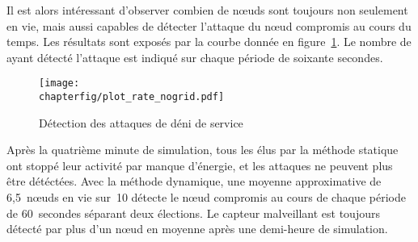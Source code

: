 Il est alors intéressant d'observer combien de nœuds sont toujours non seulement en vie, mais aussi capables de détecter l'attaque du nœud compromis au cours du temps.
Les résultats sont exposés par la courbe donnée en figure~\ref{sa:fig:detection-dos}.
Le nombre de \cns ayant détecté l'attaque est indiqué sur chaque période de soixante secondes.
\begin{figure}[ht]
    \centering
    \texttt{[image: \\chapterfig/plot\_rate\_nogrid.pdf]}
    \caption{Détection des attaques de déni de service}\label{sa:fig:detection-dos}
\end{figure}
Après la quatrième minute de simulation, tous les \cns élus par la méthode statique ont stoppé leur activité par manque d'énergie, et les attaques ne peuvent plus être détéctées.
Avec la méthode dynamique, une moyenne approximative de 6,5~nœuds en vie sur~10 détecte le nœud compromis au cours de chaque période de 60~secondes séparant deux élections.
Le capteur malveillant est toujours détecté par plus d'un nœud en moyenne après une demi-heure de simulation.
